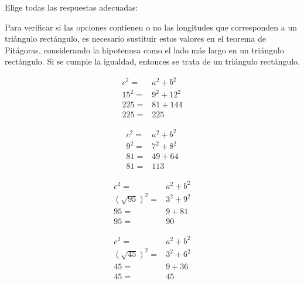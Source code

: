 Elige todas las respuestas adecuadas:

\begin{solutionbox}{6cm}
    Para verificar si las opciones contienen o no las longitudes que corresponden a un triángulo rectángulo, es necesario sustituir estos valores en el teorema de Pitágoras, considerando la hipotenusa como el lado más largo en un triángulo rectángulo. Si se cumple la igualdad, entonces se trata de un triángulo rectángulo.

    \begin{multicols}{4}
        \begin{align*}
            c^2=  & a^2+b^2  \\
            15^2= & 9^2+12^2 \\
            225=  & 81+144   \\
            225=  & 225
        \end{align*}

        \begin{align*}
            c^2= & a^2+b^2 \\
            9^2= & 7^2+8^2 \\
            81=  & 49+64   \\
            81=  & 113
        \end{align*}

        \begin{align*}
            c^2=           & a^2+b^2   \\
            (\sqrt{95})^2= & 3^2 + 9^2 \\
            95=            & 9+81      \\
            95=            & 90
        \end{align*}

        \begin{align*}
            c^2=           & a^2+b^2   \\
            (\sqrt{45})^2= & 3^2 + 6^2 \\
            45=            & 9+36      \\
            45=            & 45
        \end{align*}
    \end{multicols}

\end{solutionbox}